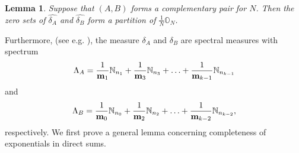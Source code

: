 \documentclass[reqno,a4paper,12pt]{amsart}
\numberwithin{equation}{section}
\newcommand{\N}{{\mathbb N}}
\newcounter{rem}
\newtheorem{lemma}[theorem]{Lemma}
\theoremstyle{remark}
\numberwithin{equation}{section}
\def\N{\mathbb{N}}
\begin{document}
\begin{lemma}\label{partitiion-lemma}
    Suppose that $(A,B)$ forms a complementary pair for $N$. Then the zero sets of $\widehat{\delta_A}$ and $\widehat{\delta_B}$ form a partition of $\frac{1}{N}{\mathbb O}_{N}$.
\end{lemma}

{Furthermore, (see e.g. \cite{GL-2014}), the measure $\delta_A$ and $\delta_B$ are spectral measures with spectrum}
\begin{equation}\label{LambdaA}
{\Lambda_A=\frac{1}{{\bf m}_1}\N_{n_1}+\frac{1}{{\bf m}_3}\N_{n_3}+\ldots+\frac{1}{{\bf m}_{k-1}}\N_{n_{k-1}}}
\end{equation}
and 
\begin{equation}\label{LambdaB}
{\Lambda_B=\frac{1}{{\bf m}_0}\N_{n_0}+\frac{1}{{\bf m}_2}\N_{n_2}+\ldots+\frac{1}{{\bf m}_{k-2}}\N_{n_{k-2}},}
\end{equation}
respectively.
We first prove a general lemma concerning completeness of exponentials in direct sums. 
\end{document}
